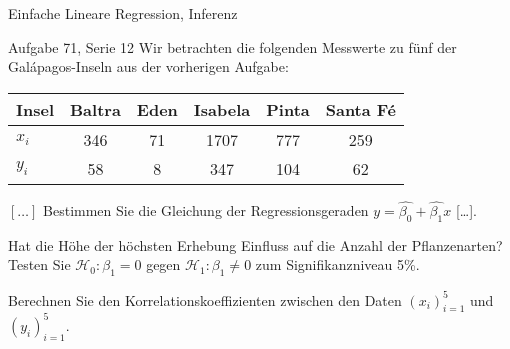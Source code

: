 \documentclass[handout]{beamer}
\begin{document}
\begin{frame}{Einfache Lineare Regression, Inferenz}
\begin{beamerboxesrounded}[shadow]{Aufgabe 71, Serie 12}
Wir betrachten die folgenden Messwerte zu fünf der Galápagos-Inseln aus der
vorherigen Aufgabe:

\begin{center}{\scriptsize\begin{tabular}{l|ccccc}\toprule
Insel & Baltra & Eden & Isabela & Pinta & Santa Fé\\\midrule
$x_i$&
 346 & 71 & 1707 & 777 & 259\\
$y_i$&
  58 & 8 & 347 & 104 & 62\\
\bottomrule
\end{tabular}}\end{center}

\begin{outline}
\item \textcolor{black!20}{$[\dots]$ Bestimmen Sie die Gleichung der Regressionsgeraden
$y=\hat{\beta_0}+\hat{\beta_1}x$ [\dots].}
\item Hat die Höhe der höchsten Erhebung Einfluss auf die Anzahl der Pflanzenarten?
Testen Sie $\mathcal{H}_0: \beta_1 = 0$ gegen $\mathcal{H}_1: \beta_1 \ne 0$
zum Signifikanzniveau 5\%.
\textcolor{black!20}{\item Berechnen Sie den Korrelationskoeffizienten zwischen den Daten
$(x_i)_{i=1}^5$ und $(y_i)_{i=1}^5$.}
\end{outline}
\end{beamerboxesrounded}
\end{frame}

%
%
\end{document}
